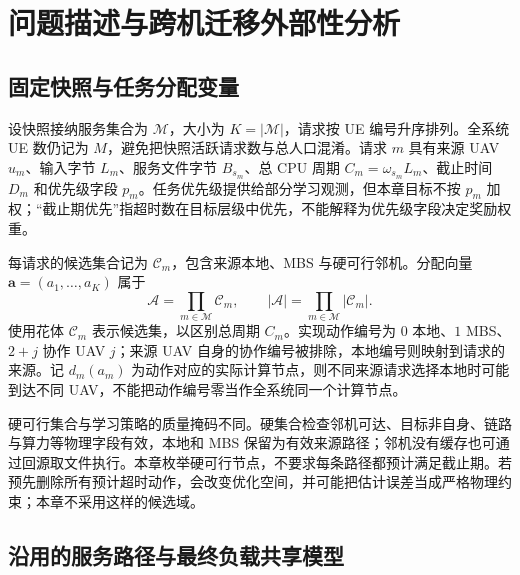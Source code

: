 \section{问题描述与跨机迁移外部性分析}
\label{sec:ch4-problem-externality}
\label{sec:offload-execution-model}

\subsection{固定快照与任务分配变量}
\label{sec:ch4-variables}

设快照接纳服务集合为 $\mathcal M$，大小为 $K=|\mathcal M|$，请求按 UE 编号升序排列。全系统 UE 数仍记为 $M$，避免把快照活跃请求数与总人口混淆。请求 $m$ 具有来源 UAV $u_m$、输入字节 $L_m$、服务文件字节 $B_{s_m}$、总 CPU 周期 $C_m=\omega_{s_m}L_m$、截止时间 $D_m$ 和优先级字段 $p_m$。任务优先级提供给部分学习观测，但本章目标不按 $p_m$ 加权；“截止期优先”指超时数在目标层级中优先，不能解释为优先级字段决定奖励权重。

每请求的候选集合记为 $\mathcal C_m$，包含来源本地、MBS 与硬可行邻机。分配向量 $\mathbf a=(a_1,\ldots,a_K)$ 属于
\begin{equation}
 \mathcal A=\prod_{m\in\mathcal M}\mathcal C_m,\qquad
 |\mathcal A|=\prod_{m\in\mathcal M}|\mathcal C_m|.
 \label{eq:ch4-assignment-space}
\end{equation}
使用花体 $\mathcal C_m$ 表示候选集，以区别总周期 $C_m$。实现动作编号为 $0$ 本地、$1$ MBS、$2+j$ 协作 UAV $j$；来源 UAV 自身的协作编号被排除，本地编号则映射到请求的来源。记 $d_m(a_m)$ 为动作对应的实际计算节点，则不同来源请求选择本地时可能到达不同 UAV，不能把动作编号零当作全系统同一个计算节点。

硬可行集合与学习策略的质量掩码不同。硬集合检查邻机可达、目标非自身、链路与算力等物理字段有效，本地和 MBS 保留为有效来源路径；邻机没有缓存也可通过回源取文件执行。本章枚举硬可行节点，不要求每条路径都预计满足截止期。若预先删除所有预计超时动作，会改变优化空间，并可能把估计误差当成严格物理约束；本章不采用这样的候选域。

\subsection{沿用的服务路径与最终负载共享模型}
\label{sec:tx-cmp-model}
\label{sec:ch4-final-load}

